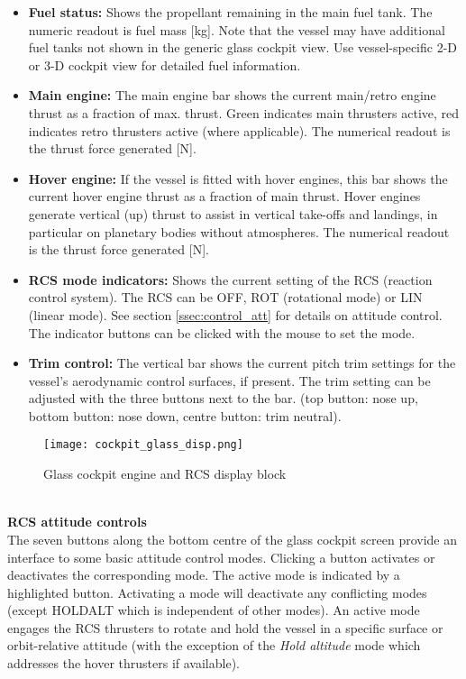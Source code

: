 \documentclass[Orbiter User Manual.tex]{subfiles}
\begin{document}
\begin{itemize}
\item \textbf{Fuel status:} Shows the propellant remaining in the main fuel tank. The numeric readout is fuel mass [kg]. Note that the vessel may have additional fuel tanks not shown in the generic glass cockpit view. Use vessel-specific 2-D or 3-D cockpit view for detailed fuel information.
\item \textbf{Main engine:} The main engine bar shows the current main/retro engine thrust as a fraction of max. thrust. Green indicates main thrusters active, red indicates retro thrusters active (where applicable). The numerical readout is the thrust force generated [N]. 
\item \textbf{Hover engine:} If the vessel is fitted with hover engines, this bar shows the current hover engine thrust as a fraction of main thrust. Hover engines generate vertical (up) thrust to assist in vertical take-offs and landings, in particular on planetary bodies without atmospheres. The numerical readout is the thrust force generated [N].
\item \textbf{RCS mode indicators:} Shows the current setting of the RCS (reaction control system). The RCS can be OFF, ROT (rotational mode) or LIN (linear mode). See section \ref{ssec:control_att} for details on attitude control. The indicator buttons can be clicked with the mouse to set the mode.
\item \textbf{Trim control:} The vertical bar shows the current pitch trim settings for the vessel's aerodynamic control surfaces, if present. The trim setting can be adjusted with the three buttons next to the bar. (top button: nose up, bottom button: nose down, centre button: trim neutral).

\end{itemize}


\begin{figure}[H]
  \centering
  \texttt{[image: cockpit\_glass\_disp.png]}
  \caption{Glass cockpit engine and RCS display block}
\end{figure}

\noindent
\\
\textbf{RCS attitude controls}\\
The seven buttons along the bottom centre of the glass cockpit screen provide an interface to some basic attitude control modes. Clicking a button activates or deactivates the corresponding mode. The active mode is indicated by a highlighted button. Activating a mode will deactivate any conflicting modes (except HOLDALT which is independent of other modes). An active mode engages the RCS thrusters to rotate and hold the vessel in a specific surface or orbit-relative attitude (with the exception of the \textit{Hold altitude} mode which addresses the hover thrusters if available).
\end{document}
